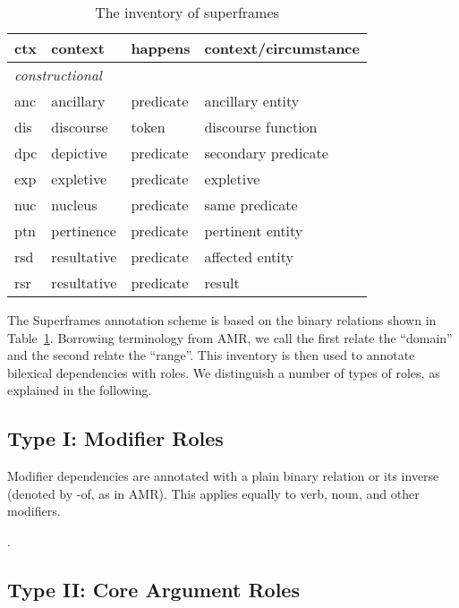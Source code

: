 \documentclass[a4paper]{article}
\begin{document}
\begin{table}
\begin{tabular}{llll}
        ctx & context & happens & context/circumstance \\
        \midrule
        \multicolumn{4}{l}{\emph{constructional}} \\
        anc & ancillary & predicate & ancillary entity \\
        dis & discourse & token & discourse function \\
        dpc & depictive & predicate & secondary predicate\\
        exp & expletive & predicate & expletive \\
        nuc & nucleus & predicate & same predicate \\
        ptn & pertinence & predicate & pertinent entity \\
        rsd & resultative & predicate & affected entity \\
        rsr & resultative & predicate & result \\ 
        \bottomrule
    \end{tabular}
    \caption{The inventory of superframes}
    \label{tab:inventory}
\end{table}

The Superframes annotation scheme is based on the binary relations shown in Table~\ref{tab:inventory}. Borrowing terminology from AMR, we call the first relate the ``domain'' and the second relate the ``range''. This inventory is then used to annotate bilexical dependencies with roles. We distinguish a number of types of roles, as explained in the following.

\subsection{Type I: Modifier Roles}

Modifier dependencies are annotated with a plain binary relation or its inverse (denoted by \textsf{-of}, as in AMR). This applies equally to verb, noun, and other modifiers.

\ex. 

\subsection{Type II: Core Argument Roles}
\end{document}
